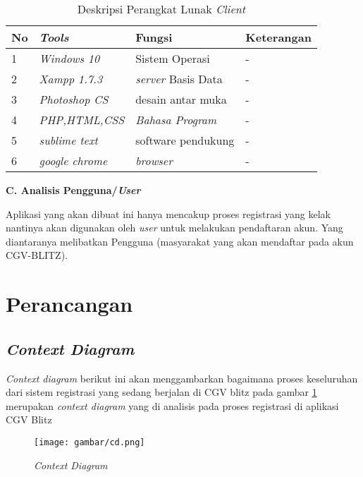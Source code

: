 \begin{table}[!htbp]
\captionsetup{singlelinecheck=off}
\caption{Deskripsi Perangkat Lunak \textit{Client}}
\label{lunakclient}
\begin{tabular}{|l|l|l|l|}
\hline
No & \textit{Tools} & Fungsi & Keterangan \\
\hline

1 &  \textit{Windows 10} & Sistem Operasi  & -  \\

\hline

2 &  \textit{Xampp 1.7.3} & \textit{server} Basis Data & - \\
\hline

3 &  \textit{Photoshop CS} & desain antar muka & - \\
\hline

4 &  \textit{PHP,HTML,CSS} & \textit{Bahasa Program} & -  \\    
\hline

5 & \textit{sublime text} & software pendukung & - \\
\hline

6 & \textit{google chrome} & \textit{browser} & - \\
\hline
\end{tabular}
\end{table}

\textbf{C.	Analisis Pengguna/\textit{User}}
\par
Aplikasi yang akan dibuat ini hanya mencakup proses registrasi yang kelak nantinya akan digunakan oleh \textit{user} untuk melakukan pendaftaran akun. Yang diantaranya melibatkan Pengguna (masyarakat yang akan mendaftar pada akun CGV-BLITZ).

\section{Perancangan}
\subsection{\textit{Context Diagram}}
\par
\textit{Context diagram} berikut ini akan menggambarkan bagaimana proses keseluruhan dari sistem registrasi yang sedang berjalan di CGV blitz
pada gambar \ref{cd} merupakan \textit{context diagram} yang di analisis pada proses registrasi di aplikasi CGV Blitz

\begin{figure}[!htbp]
    \centering
    \texttt{[image: gambar/cd.png]}
    \caption{\textit{Context Diagram}}
    \label{cd}
\end{figure}


